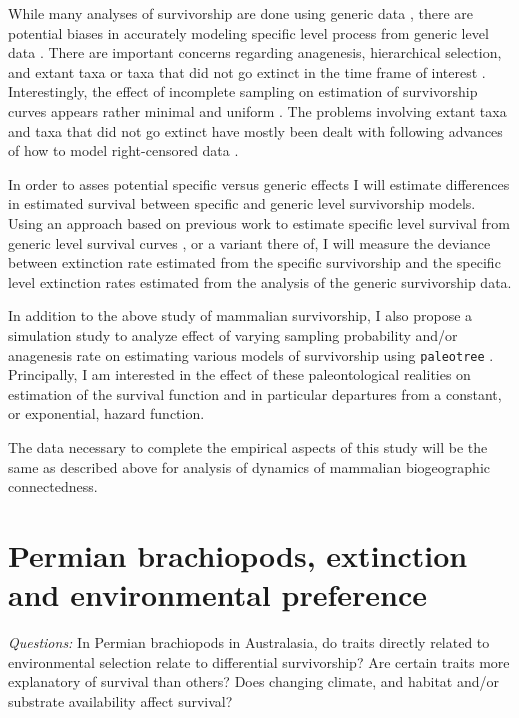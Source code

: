 \documentclass[12pt,letterpaper]{article}
\begin{document}

While many analyses of survivorship are done using generic data \citep{Tomiya2013,Liow2008,Harnik2013}, there are potential biases in accurately modeling specific level process from generic level data \citep{Raup1975,Sepkoski1975,Simpson2006,Raup1991a,VanValen1979}. There are important concerns regarding anagenesis, hierarchical selection, and extant taxa or taxa that did not go extinct in the time frame of interest \citep{Raup1975,VanValen1979,Simpson2006,Raup1991a}. Interestingly, the effect of incomplete sampling on estimation of survivorship curves appears rather minimal and uniform \citep{Sepkoski1975}. The problems involving extant taxa and taxa that did not go extinct have mostly been dealt with following advances of how to model right-censored data \citep{Kleinbaum2005}.

In order to asses potential specific versus generic effects I will estimate differences in estimated survival between specific and generic level survivorship models. Using an approach based on previous work to estimate specific level survival from generic level survival curves \citep{Foote1988}, or a variant there of, I will measure the deviance between extinction rate estimated from the specific survivorship and the specific level extinction rates estimated from the analysis of the generic survivorship data. 

In addition to the above study of mammalian survivorship, I also propose a simulation study to analyze effect of varying sampling probability and/or anagenesis rate on estimating various models of survivorship using \texttt{paleotree} \citep{Bapst2012a}. Principally, I am interested in the effect of these paleontological realities on estimation of the survival function and in particular departures from a constant, or exponential, hazard function. 

The data necessary to complete the empirical aspects of this study will be the same as described above for analysis of dynamics of mammalian biogeographic connectedness.


\section{Permian brachiopods, extinction and environmental preference}

\textit{Questions:} In Permian brachiopods in Australasia, do traits directly related to environmental selection relate to differential survivorship? Are certain traits more explanatory of survival than others? Does changing climate, and habitat and/or substrate availability affect survival?
\end{document}
